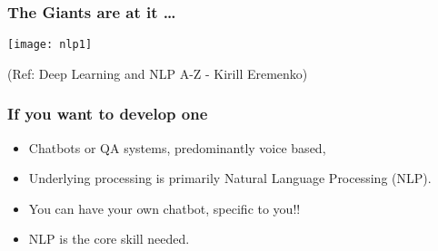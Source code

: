 
	

  
  

	




  
  

	


\begin{frame}[fragile]\frametitle{The Giants are at it \ldots}
\begin{center}
\texttt{[image: nlp1]}

\tiny{(Ref: Deep Learning and NLP A-Z - Kirill Eremenko)}
\end{center}

	
\end{frame}

\begin{frame}[fragile]\frametitle{If you want to develop one}
	\begin{itemize}
	\item Chatbots or QA systems, predominantly voice based, 
	\item Underlying processing is primarily Natural Language Processing (NLP).
	\item You can have your own chatbot, specific to you!! 
	\item NLP is the core skill needed.
	\end{itemize}
	
\end{frame}


